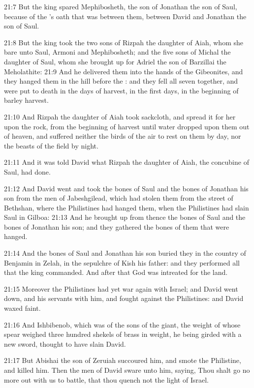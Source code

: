 21:7 But the king spared Mephibosheth, the son of Jonathan the son of
Saul, because of the \LORD's oath that was between them, between David
and Jonathan the son of Saul.

21:8 But the king took the two sons of Rizpah the daughter of Aiah,
whom she bare unto Saul, Armoni and Mephibosheth; and the five sons of
Michal the daughter of Saul, whom she brought up for Adriel the son of
Barzillai the Meholathite: 21:9 And he delivered them into the hands
of the Gibeonites, and they hanged them in the hill before the \LORD:
and they fell all seven together, and were put to death in the days of
harvest, in the first days, in the beginning of barley harvest.

21:10 And Rizpah the daughter of Aiah took sackcloth, and spread it
for her upon the rock, from the beginning of harvest until water
dropped upon them out of heaven, and suffered neither the birds of the
air to rest on them by day, nor the beasts of the field by night.

21:11 And it was told David what Rizpah the daughter of Aiah, the
concubine of Saul, had done.

21:12 And David went and took the bones of Saul and the bones of
Jonathan his son from the men of Jabeshgilead, which had stolen them
from the street of Bethshan, where the Philistines had hanged them,
when the Philistines had slain Saul in Gilboa: 21:13 And he brought up
from thence the bones of Saul and the bones of Jonathan his son; and
they gathered the bones of them that were hanged.

21:14 And the bones of Saul and Jonathan his son buried they in the
country of Benjamin in Zelah, in the sepulchre of Kish his father: and
they performed all that the king commanded. And after that God was
intreated for the land.

21:15 Moreover the Philistines had yet war again with Israel; and
David went down, and his servants with him, and fought against the
Philistines: and David waxed faint.

21:16 And Ishbibenob, which was of the sons of the giant, the weight
of whose spear weighed three hundred shekels of brass in weight, he
being girded with a new sword, thought to have slain David.

21:17 But Abishai the son of Zeruiah succoured him, and smote the
Philistine, and killed him. Then the men of David sware unto him,
saying, Thou shalt go no more out with us to battle, that thou quench
not the light of Israel.

